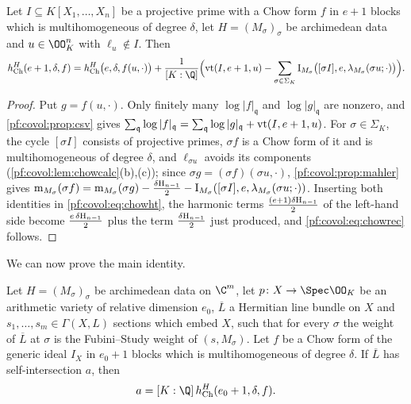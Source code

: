 \begin{proposition}\label{pf:covol:prop:recursion}
Let $I\subseteq K[X_1,\dots,X_n]$ be a projective prime with a Chow form $f$ in $e+1$ blocks which is
multihomogeneous of degree $\delta$, let $H=(M_\sigma)_\sigma$ be archimedean data and $u\in\OO_K^n$ with
$\ell_u\notin I$. Then
\begin{equation}\label{pf:covol:eq:chowrec}
\covolHch^H(e+1,\delta,f)=\covolHch^H\bigl(e,\delta,f(u,\cdot)\bigr)+\frac1{[K:\Q]}\Bigl(\covolVt(I,e+1,u)-
\sum_{\sigma\in\Sigma_K}\covolCyc_{M_\sigma}\bigl([\sigma I],e,\covolFs_{M_\sigma}(\sigma u;\cdot)\bigr)\Bigr).
\end{equation}
\end{proposition}

\begin{proof}
Put $g=f(u,\cdot)$. Only finitely many $\log|f|_{\mathfrak q}$ and $\log|g|_{\mathfrak q}$ are nonzero,
and \cref{pf:covol:prop:csv} gives $\sum_{\mathfrak q}\log|f|_{\mathfrak q}=
\sum_{\mathfrak q}\log|g|_{\mathfrak q}+\operatorname{vt}(I,e+1,u)$. For $\sigma\in\Sigma_K$, the cycle
$[\sigma I]$ consists of projective primes, $\sigma f$ is a Chow form of it and is multihomogeneous of
degree $\delta$, and $\ell_{\sigma u}$ avoids its components (\cref{pf:covol:lem:chowcalc}(b),(c));
since $\sigma g=(\sigma f)(\sigma u,\cdot)$, \cref{pf:covol:prop:mahler} gives
$\operatorname{m}_{M_\sigma}(\sigma f)=\operatorname{m}_{M_\sigma}(\sigma g)-\frac{\delta\mathrm{H}_{n-1}}2-
\operatorname{I}_{M_\sigma}([\sigma I],e,\lambda_{M_\sigma}(\sigma u;\cdot))$. Inserting both identities in
\eqref{pf:covol:eq:chowht}, the harmonic terms $\frac{(e+1)\delta\mathrm{H}_{n-1}}2$ of the left-hand side
become $\frac{e\,\delta\mathrm{H}_{n-1}}2$ plus the term $\frac{\delta\mathrm{H}_{n-1}}2$ just produced,
and \eqref{pf:covol:eq:chowrec} follows.
\end{proof}

We can now prove the main identity.

\begin{theorem}\label{pf:covol:thm:main}
Let $H=(M_\sigma)_\sigma$ be archimedean data on $\C^m$, let $p\colon X\to\Spec\OO_K$ be an arithmetic
variety of relative dimension $e_0$, $\overline L$ a Hermitian line bundle on $X$ and
$s_1,\dots,s_m\in\Gamma(X,L)$ sections which embed $X$, such that for every $\sigma$ the weight of
$\overline L$ at $\sigma$ is the Fubini--Study weight of $(s,M_\sigma)$. Let $f$ be a Chow form of the
generic ideal $I_X$ in $e_0+1$ blocks which is multihomogeneous of degree $\delta$. If $\overline L$ has
self-intersection $a$, then
\[
a=[K:\Q]\,\covolHch^H(e_0+1,\delta,f).
\]
\end{theorem}

